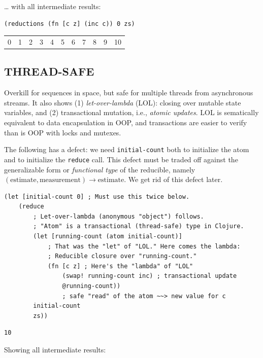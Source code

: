 \documentclass[10pt,oneside,x11names]{article}
\begin{document}
\ldots{} with all intermediate results:

\begin{verbatim}
(reductions (fn [c z] (inc c)) 0 zs)
\end{verbatim}

\begin{center}
\begin{tabular}{rrrrrrrrrrr}
0 & 1 & 2 & 3 & 4 & 5 & 6 & 7 & 8 & 9 & 10\\
\end{tabular}
\end{center}

\subsection{THREAD-SAFE}
\label{thread-safe}
Overkill for sequences in space, but safe for multiple threads from
asynchronous streams. It also shows (1) \emph{let-over-lambda} (LOL): closing
over mutable state variables, and (2) transactional mutation, i.e.,
\emph{atomic updates}. LOL is sematically equivalent to data encapsulation in
OOP, and transactions are easier to verify than is OOP with locks and
mutexes.

The following has a defect: we need \texttt{initial-count} both to initialize
the atom and to initialize the \texttt{reduce} call. This defect must be traded
off against the generalizable form or \emph{functional type} of the
reducible, namely
\((\textrm{estimate}, \textrm{measurement})\rightarrow\textrm{estimate}\).
We get rid of this defect later.

\begin{verbatim}
(let [initial-count 0] ; Must use this twice below.
    (reduce
        ; Let-over-lambda (anonymous "object") follows.
        ; "Atom" is a transactional (thread-safe) type in Clojure.
        (let [running-count (atom initial-count)]
            ; That was the "let" of "LOL." Here comes the lambda:
            ; Reducible closure over "running-count."
            (fn [c z] ; Here's the "lambda" of "LOL"
                (swap! running-count inc) ; transactional update
                @running-count))
                ; safe "read" of the atom ~~> new value for c
        initial-count
        zs))
\end{verbatim}

\begin{verbatim}
10
\end{verbatim}


Showing all intermediate results:
\end{document}

